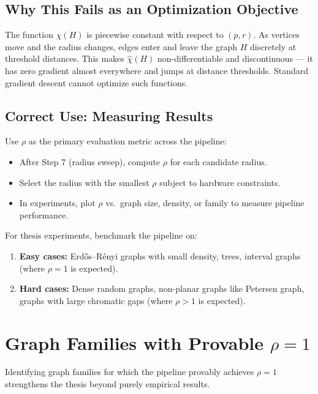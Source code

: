 \documentclass[11pt]{article}
\newcommand{\chihat}{\widehat{\chi}}
\begin{document}
\subsection{Why This Fails as an Optimization Objective}

The function $\chihat(H)$ is piecewise constant with respect to $(p, r)$. As
vertices move and the radius changes, edges enter and leave the graph $H$
discretely at threshold distances. This makes $\chihat(H)$ non-differentiable
and discontinuous — it has zero gradient almost everywhere and jumps at
distance thresholds. Standard gradient descent cannot optimize such functions.

\subsection{Correct Use: Measuring Results}

Use $\rho$ as the primary evaluation metric across the pipeline:
\begin{itemize}
  \item After Step 7 (radius sweep), compute $\rho$ for each candidate radius.
  \item Select the radius with the smallest $\rho$ subject to hardware constraints.
  \item In experiments, plot $\rho$ vs.\ graph size, density, or family to
    measure pipeline performance.
\end{itemize}

For thesis experiments, benchmark the pipeline on:
\begin{enumerate}
  \item \textbf{Easy cases:} Erd\H{o}s--R\'enyi graphs with small density, trees,
    interval graphs (where $\rho = 1$ is expected).
  \item \textbf{Hard cases:} Dense random graphs, non-planar graphs like
    Petersen graph, graphs with large chromatic gaps (where $\rho > 1$ is
    expected).
\end{enumerate}

\newpage

\section{Graph Families with Provable $\rho = 1$}

Identifying graph families for which the pipeline provably achieves $\rho = 1$
strengthens the thesis beyond purely empirical results.
\end{document}
